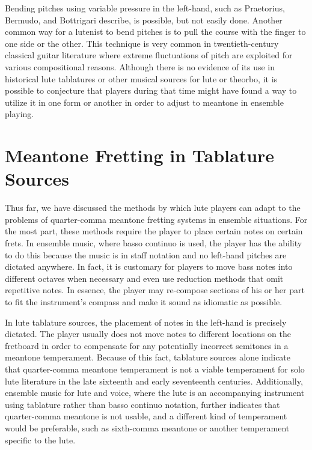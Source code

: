 Bending pitches using variable pressure in the left-hand, such as Praetorius, Bermudo, and Bottrigari describe, is
possible, but not easily done. Another common way for a lutenist to bend pitches is to pull the course with the finger
to one side or the other. This technique is very common in twentieth-century classical guitar literature where extreme
fluctuations of pitch are exploited for various compositional reasons. Although there is no evidence of its use in
historical lute tablatures or other musical sources for lute or theorbo, it is possible to conjecture that players
during that time might have found a way to utilize it in one form or another in order to adjust to meantone in ensemble
playing.

\section{Meantone Fretting in Tablature Sources}

Thus far, we have discussed the methods by which lute players can adapt to the problems of quarter-comma meantone
fretting systems in ensemble situations. For the most part, these methods require the player to place certain notes on
certain frets. In ensemble music, where basso continuo is used, the player has the ability to do this because the music
is in staff notation and no left-hand pitches are dictated anywhere. In fact, it is customary for players to move bass
notes into different octaves when necessary and even use reduction methods that omit repetitive notes. In essence, the
player may re-compose sections of his or her part to fit the instrument's compass and make it sound as idiomatic as
possible.

In lute tablature sources, the placement of notes in the left-hand is precisely dictated. The player usually does not
move notes to different locations on the fretboard in order to compensate for any potentially incorrect semitones in a
meantone temperament. Because of this fact, tablature sources alone indicate that quarter-comma meantone temperament is
not a viable temperament for solo lute literature in the late sixteenth and early seventeenth centuries. Additionally,
ensemble music for lute and voice, where the lute is an accompanying instrument using tablature rather than basso
continuo notation, further indicates that quarter-comma meantone is not usable, and a different kind of temperament
would be preferable, such as sixth-comma meantone or another temperament specific to the lute.

